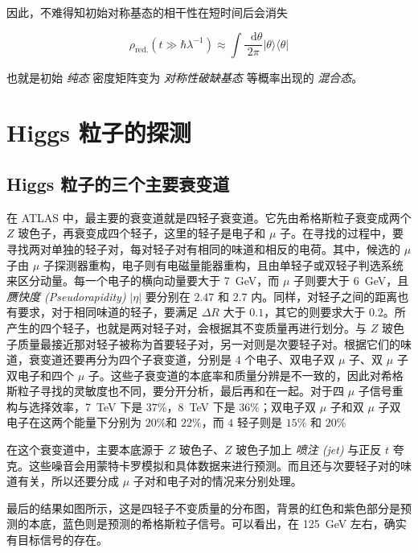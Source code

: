 \documentclass[oneside,a4paper,openany,11pt]{ctexbook}
\newcommand*{\dif}{\mathop{}\!\mathrm{d}} %
\begin{document}
因此，不难得知初始对称基态的相干性在短时间后会消失

\begin{equation}
    \rho_{\mathrm{red.}}(t \gg \hbar \lambda^{-1}) \approx \int \frac{\dif \theta}{2\pi} |\theta\rangle \langle\theta|
    \label{equ:4}
\end{equation}

也就是初始 \emph{纯态} 密度矩阵变为 \emph{对称性破缺基态} 等概率出现的 \emph{混合态}。

\chapter{Higgs 粒子的探测}

\section{Higgs 粒子的三个主要衰变道}

在 ATLAS 中，最主要的衰变道就是四轻子衰变道。它先由希格斯粒子衰变成两个 $Z$ 玻色子，再衰变成四个轻子，这里的轻子是电子和 $\mu$ 子。在寻找的过程中，要寻找两对单独的轻子对，每对轻子对有相同的味道和相反的电荷。其中，候选的 $\mu$ 子由 $\mu$ 子探测器重构，电子则有电磁量能器重构，且由单轻子或双轻子判选系统来区分动量。每一个电子的横向动量要大于 \qty{7}{GeV}，而 $\mu$ 子则要大于 \qty{6}{GeV}，且 \emph{赝快度 (Pseudorapidity)} $|\eta|$ 要分别在 $2.47$ 和 $2.7$ 内。同样，对轻子之间的距离也有要求，对于相同味道的轻子，要满足 $\Delta R$ 大于 $0.1$，其它的则要求大于 $0.2$。所产生的四个轻子，也就是两对轻子对，会根据其不变质量再进行划分。与 $Z$ 玻色子质量最接近那对轻子被称为首要轻子对，另一对则是次要轻子对。根据它们的味道，衰变道还要再分为四个子衰变道，分别是 $4$ 个电子、双电子双 $\mu$ 子、双 $\mu$ 子双电子和四个 $\mu$ 子。这些子衰变道的本底率和质量分辨是不一致的，因此对希格斯粒子寻找的灵敏度也不同，要分开分析，最后再和在一起。对于四 $\mu$ 子信号重构与选择效率，\qty{7}{TeV} 下是 $37\%$，\qty{8}{TeV} 下是 $36\%$；双电子双 $\mu$ 子和双 $\mu$ 子双电子在这两个能量下分别为 $20\%$和 $22\%$，而 $4$ 轻子则是 $15\%$ 和 $20\%$

在这个衰变道中，主要本底源于 $Z$ 玻色子、$Z$ 玻色子加上 \emph{喷注 (jet)} 与正反 $t$ 夸克。这些噪音会用蒙特卡罗模拟和具体数据来进行预测。而且还与次要轻子对的味道有关，所以还要分成 $\mu$ 子对和电子对的情况来分别处理。

最后的结果如图所示，这是四轻子不变质量的分布图，背景的红色和紫色部分是预测的本底，蓝色则是预测的希格斯粒子信号。可以看出，在 \qty{125}{GeV} 左右，确实有目标信号的存在。
\end{document}
